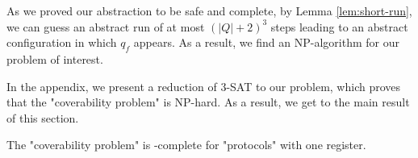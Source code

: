 

As we proved our abstraction to be safe and complete, by Lemma \ref{lem:short-run}, we can guess an abstract run of at most $(|Q| + 2)^3$ steps leading to an abstract configuration in which $q_f$ appears. As a result, we find an NP-algorithm for our problem of interest.

In the appendix, we present a reduction of 3-SAT to our problem, which proves that the "coverability problem" is NP-hard. As a result, we get to the main result of this section.

\begin{theorem}
	\label{thm:np-complete-query-cover}
	The "coverability problem" is \NP-complete for "protocols" with one register.
\end{theorem}

